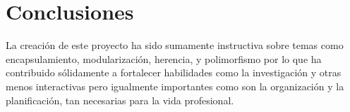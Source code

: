 \documentclass[a4paper, 12pt]{article}
\begin{document}
\subsubsection{}\label{}


\subsubsection{}\label{}





\subsubsection{}\label{}




\newpage

\section{Conclusiones}\label{sec:concl}
La creación de este proyecto ha sido sumamente instructiva sobre temas como encapsulamiento, modularización, herencia, y polimorfismo por lo que  ha contribuido sólidamente a fortalecer habilidades como la investigación y otras menos interactivas pero igualmente importantes como son la organización y la planificación, tan necesarias para la vida profesional.
\end{document}
